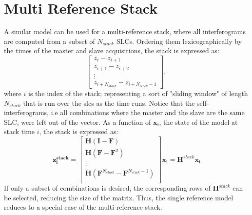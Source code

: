 \documentclass{article}
\begin{document}
\section{Multi Reference Stack}
A similar model can be used for a multi-reference stack, where all interferograms  are computed from a subset of $N_{stack}$ SLCs. Ordering them lexicographically by the times of the master and slave acquisitions, the stack is expressed as:
\begin{equation}\label{eq:stack}
	\begin{bmatrix}
		z_{i} - z_{i+1}\\
		z_{i+1} - z_{i+2}\\
		\vdots\\
		z_{i+N_{stack}} - z_{i+N_{stack} - 1}
	\end{bmatrix},
\end{equation}
where $i$ is the index of the stack; representing a sort of "sliding window" of length $N_{stack}$ that is run over the slcs as the time runs.
Notice that the self-interferograms, i.e all combinations where the master and the slave are the same SLC, were left out of the vector.
As a function of $\mathbf{x_{i}}$, the state of the model at stack time $i$, the stack is expressed as:
\begin{equation}\label{eq:stack_observation}
	\mathbf{z_{i}^{stack}} =
	\begin{bmatrix}
	 	\mathbf{H} \left(\mathbf{I} -\mathbf{F} \right)\\
	 	\mathbf{H} \left(\mathbf{F} -\mathbf{F}^2 \right)\\
	 	\vdots\\
	 	\mathbf{H} \left(\mathbf{F}^{N_{stack}} -\mathbf{F}^{N_{stack} - 1} \right)\\
	\end{bmatrix}\mathbf{x_i} = \mathbf{H}^{stack} \mathbf{x_i}
\end{equation}
If only a subset of combinations is desired, the corresponding rows of $\mathbf{H}^{stack}$ can be selected, reducing the size of the matrix. Thus, the single reference model reduces to a special case of the multi-reference stack.
\end{document}

